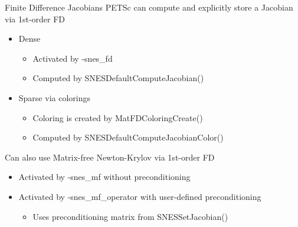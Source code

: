 \begin{frame}{Finite Difference Jacobians}
  PETSc can compute and explicitly store a Jacobian via 1st-order FD
  \begin{itemize}
  \item Dense
    \begin{itemize}
    \item Activated by {\kb -snes\_fd}
    \item Computed by {\kb SNESDefaultComputeJacobian()}
    \end{itemize}
  \item Sparse via colorings
    \begin{itemize}
    \item Coloring is created by {\kb MatFDColoringCreate()}
    \item Computed by {\kb SNESDefaultComputeJacobianColor()}
    \end{itemize}
  \end{itemize}
  Can also use Matrix-free Newton-Krylov via 1st-order FD
  \begin{itemize}
  \item Activated by {\kb -snes\_mf} without preconditioning
  \item Activated by {\kb -snes\_mf\_operator} with user-defined preconditioning
    \begin{itemize}
    \item Uses preconditioning matrix from {\kb SNESSetJacobian()}
    \end{itemize}
  \end{itemize}
\end{frame}
